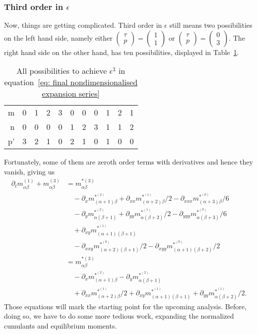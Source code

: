 \subsubsection{Third order in \texorpdfstring{$\epsilon$}{epsilon}}
\label{subs: Third order in epsilon}
Now, things are getting complicated.
Third order in $\epsilon$ still means two possibilities on the left hand side, namely either $\begin{pmatrix}\tau \\ p\end{pmatrix} = \begin{pmatrix} 1 \\ 1 \end{pmatrix}$ or $\begin{pmatrix}\tau \\ p\end{pmatrix} = \begin{pmatrix} 0 \\ 3 \end{pmatrix}$.
The right hand side on the other hand, has ten possibilities, displayed in Table~\ref{table: third order epsilon}.
\begin{table}[h]
  \centering
  \begin{tabular} {r || c | *{3}{c} | *{3}{c} | *{3}{c} }
    m  & 0 & 1 & 2 & 3 & 0 & 0 & 0 & 1 & 2 & 1 \\
    n  & 0 & 0 & 0 & 0 & 1 & 2 & 3 & 1 & 1 & 2 \\
    p' & 3 & 2 & 1 & 0 & 2 & 1 & 0 & 1 & 0 & 0
  \end{tabular}
  \caption{All possibilities to achieve $\epsilon^3$ in equation~\eqref{eq: final nondimensionalised expansion series}}
\label{table: third order epsilon}
\end{table}
Fortunately, some of them are zeroth order terms with derivatives and hence they vanish, giving us
\begin{equation}
  \label{eq: third order in epsilon}
  \begin{aligned}
    \partial_t m_{\alpha\beta}^{(1)} + m_{\alpha\beta}^{(3)}
    & =  m_{\alpha\beta}^{*(3)} \\
    &\quad - \partial_x m_{(\alpha+1)\beta}^{*^{(2)}} + \partial_{xx} m_{(\alpha+2)\beta}^{*^{(1)}}/2 - \partial_{xxx} m_{(\alpha+3)\beta}^{*^{(0)}}/6 \\
    &\quad - \partial_y m_{\alpha(\beta+1)}^{*^{(2)}} + \partial_{yy} m_{\alpha(\beta+2)}^{*^{(1)}}/2 - \partial_{yyy} m_{\alpha(\beta+3)}^{*^{(0)}}/6 \\
    &\quad + \partial_{xy} m_{(\alpha+1)(\beta+1)}^{*^{(1)}} \\
    &\quad - \partial_{xxy} m_{(\alpha+2)(\beta+1)}^{*^{(0)}}/2 - \partial_{xyy} m_{(\alpha+1)(\beta+2)}^{*^{(0)}}/2 \\
    & =  m_{\alpha\beta}^{*(3)} \\
    &\quad - \partial_x m_{(\alpha+1)\beta}^{*^{(2)}} - \partial_y m_{\alpha(\beta+1)}^{*^{(2)}}  \\
    &\quad  + \partial_{xx} m_{(\alpha+2)\beta}^{*^{(1)}}/2 + \partial_{xy} m_{(\alpha+1)(\beta+1)}^{*^{(1)}} + \partial_{yy} m_{\alpha(\beta+2)}^{*^{(1)}}/2.
  \end{aligned}
\end{equation}
Those equations will mark the starting point for the upcoming analysis.
Before, doing so, we have to do some more tedious work, expanding the normalized cumulants and equilibrium moments.
